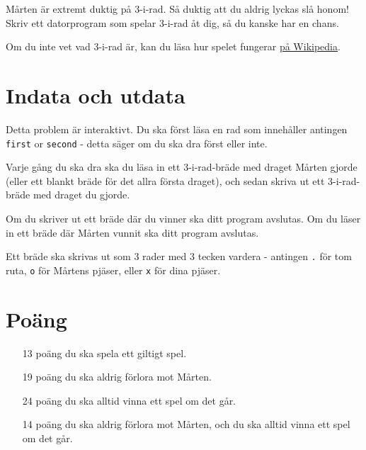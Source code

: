 
Mårten är extremt duktig på 3-i-rad. Så duktig att du aldrig lyckas slå honom! Skriv ett datorprogram som spelar 3-i-rad åt dig, så du kanske har en chans.

Om du inte vet vad 3-i-rad är, kan du läsa hur spelet fungerar \href{https://sv.wikipedia.org/wiki/Tre_i_rad}{på Wikipedia}.

\section*{Indata och utdata}
Detta problem är interaktivt. Du ska först läsa en rad som innehåller antingen \texttt{first} or \texttt{second} - detta säger om du ska dra först eller inte.

Varje gång du ska dra ska du läsa in ett 3-i-rad-bräde med draget Mårten gjorde
(eller ett blankt bräde för det allra första draget),
och sedan skriva ut ett 3-i-rad-bräde med draget du gjorde.

Om du skriver ut ett bräde där du vinner ska ditt program avslutas. Om du läser in ett bräde där Mårten vunnit ska ditt program avslutas.

Ett bräde ska skrivas ut som 3 rader med 3 tecken vardera - antingen \texttt{.} för tom ruta, \texttt{o} för Mårtens pjäser, eller \texttt{x} för dina pjäser.

\section*{Poäng}

\begin{enumerate}
	\item[13 poäng] du ska spela ett giltigt spel.
	\item[19 poäng] du ska aldrig förlora mot Mårten.
	\item[24 poäng] du ska alltid vinna ett spel om det går.
	\item[14 poäng] du ska aldrig förlora mot Mårten, och du ska alltid vinna ett spel om det går.
\end{enumerate}
